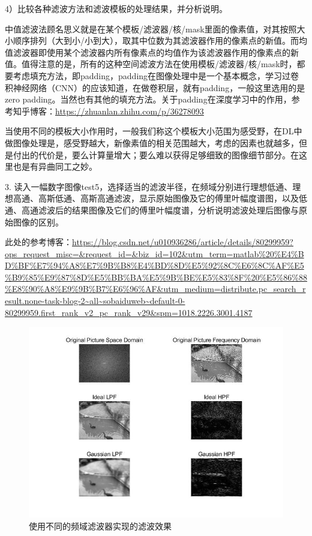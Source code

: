 \documentclass[UTF8]{article} %
\begin{document}
	
	4）比较各种滤波方法和滤波模板的处理结果，并分析说明。
	
	中值滤波法顾名思义就是在某个模板/滤波器/核/mask里面的像素值，对其按照大小顺序排列（大到小/小到大），取其中位数为其滤波器作用的像素点的新值。而均值滤波器即使用某个滤波器内所有像素点的均值作为该滤波器作用的像素点的新值。值得注意的是，所有的这种空间滤波方法在使用模板/滤波器/核/mask时，都要考虑填充方法，即padding，padding在图像处理中是一个基本概念，学习过卷积神经网络（CNN）的应该知道，在做卷积层，就有padding，一般这里选用的是zero padding。当然也有其他的填充方法。关于padding在深度学习中的作用，参考知乎博客：\url{https://zhuanlan.zhihu.com/p/36278093}
	
	当使用不同的模板大小作用时，一般我们称这个模板大小范围为感受野，在DL中做图像处理是，感受野越大，新像素值的相关范围越大，考虑的因素也就越多，但是付出的代价是，要么计算量增大；要么难以获得足够细致的图像细节部分。在这里也是有异曲同工之妙。
	
	3. 读入一幅数字图像test5，选择适当的滤波半径，在频域分别进行理想低通、理想高通、高斯低通、高斯高通滤波，显示原始图像及它的傅里叶幅度谱图，以及低通、高通滤波后的结果图像及它们的傅里叶幅度谱，分析说明滤波处理后图像与原始图像的区别。
	
	此处的参考博客：\url{https://blog.csdn.net/u010936286/article/details/80299959?ops_request_misc=&request_id=&biz_id=102&utm_term=matlab%20%E4%BD%BF%E7%94%A8%E7%9B%B8%E4%BD%8D%E5%92%8C%E6%8C%AF%E5%B9%85%E9%87%8D%E5%BB%BA%E5%9B%BE%E5%83%8F%20%E5%86%88%E8%90%A8%E9%9B%B7%E6%96%AF&utm_medium=distribute.pc_search_result.none-task-blog-2~all~sobaiduweb~default-0-80299959.first_rank_v2_pc_rank_v29&spm=1018.2226.3001.4187}
	\begin{figure}[H]
		\centering
		\includegraphics[width=0.7\linewidth]{3-4}
		\caption{使用不同的频域滤波器实现的滤波效果}
		\label{fig:3-4}
	\end{figure}
	
\end{document}

